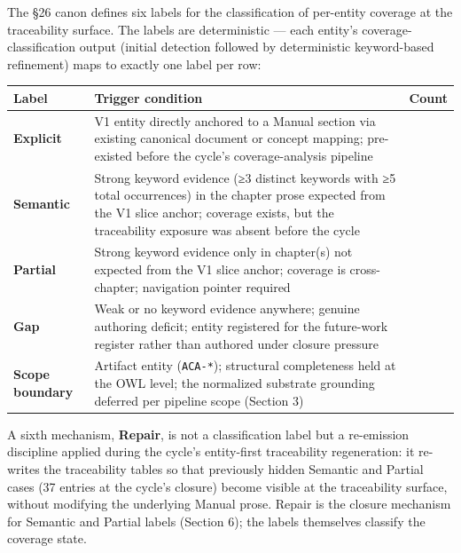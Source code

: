\documentclass[
]{article}
\begin{document}
The §26 canon defines six labels for the classification of per-entity
coverage at the traceability surface. The labels are deterministic ---
each entity's coverage-classification output (initial detection followed
by deterministic keyword-based refinement) maps to exactly one label per
row:

\begin{longtable}[]{@{}
  >{\raggedright\arraybackslash}p{}
  >{\raggedright\arraybackslash}p{}
  >{\raggedleft\arraybackslash}p{}@{}}
\toprule\noalign{}
\begin{minipage}[b]{\linewidth}\raggedright
Label
\end{minipage} & \begin{minipage}[b]{\linewidth}\raggedright
Trigger condition
\end{minipage} & \begin{minipage}[b]{\linewidth}\raggedleft
Count
\end{minipage} \\
\midrule\noalign{}
\endhead
\bottomrule\noalign{}
\endlastfoot
\textbf{Explicit} & V1 entity directly anchored to a Manual section via
existing canonical document or concept mapping; pre-existed before the
cycle's coverage-analysis pipeline & 164 \\
\textbf{Semantic} & Strong keyword evidence (≥3 distinct keywords with
≥5 total occurrences) in the chapter prose expected from the V1 slice
anchor; coverage exists, but the traceability exposure was absent before
the cycle & 31 \\
\textbf{Partial} & Strong keyword evidence only in chapter(s) not
expected from the V1 slice anchor; coverage is cross-chapter; navigation
pointer required & 6 \\
\textbf{Gap} & Weak or no keyword evidence anywhere; genuine authoring
deficit; entity registered for the future-work register rather than
authored under closure pressure & 1 \\
\textbf{Scope boundary} & Artifact entity (\texttt{ACA-*}); structural
completeness held at the OWL level; the normalized substrate grounding
deferred per pipeline scope (Section 3) & 57 \\
\end{longtable}

A sixth mechanism, \textbf{Repair}, is not a classification label but a
re-emission discipline applied during the cycle's entity-first
traceability regeneration: it re-writes the traceability tables so that
previously hidden Semantic and Partial cases (37 entries at the cycle's
closure) become visible at the traceability surface, without modifying
the underlying Manual prose. Repair is the closure mechanism for
Semantic and Partial labels (Section 6); the labels themselves classify
the coverage state.
\end{document}
